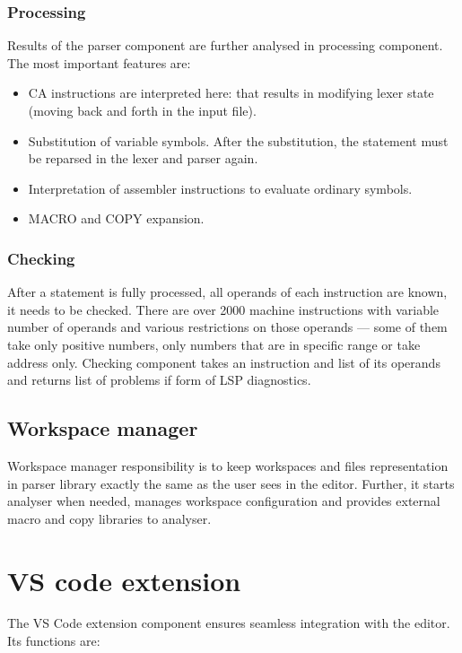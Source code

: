\subsubsection{Processing}

Results of the parser component are further analysed in processing component. The most important features are:

\begin{itemize}
	\item CA instructions are interpreted here: that results in modifying lexer state (moving back and forth in the input file).
	\item Substitution of variable symbols. After the substitution, the statement must be reparsed in the lexer and parser again.
	\item Interpretation of assembler instructions to evaluate ordinary symbols.
	\item MACRO and COPY expansion.
\end{itemize}

\subsubsection{Checking}
After a statement is fully processed, all operands of each instruction are known, it needs to be checked. There are over 2000 machine instructions with variable number of operands and various restrictions on those operands --- some of them take only positive numbers, only numbers that are in specific range or take address only. Checking component takes an instruction and list of its operands and returns list of problems if form of LSP diagnostics.


\subsection{Workspace manager}

Workspace manager responsibility is to keep workspaces and files representation in parser library exactly the same as the user sees in the editor. Further, it starts analyser when needed, manages workspace configuration and provides external macro and copy libraries to analyser.

\section{VS code extension}

The VS Code extension component ensures seamless integration with the editor. Its functions are:

